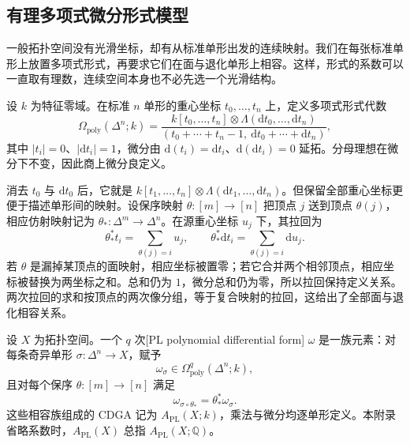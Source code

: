 \subsection{有理多项式微分形式模型}
\label{g2:subsec:E01:03}

一般拓扑空间没有光滑坐标，却有从标准单形出发的连续映射。我们在每张标准单形上放置多项式形式，再要求它们在面与退化单形上相容。这样，形式的系数可以一直取有理数，连续空间本身也不必先选一个光滑结构。

\begin{definition}\label{g2:def:polynomial-forms}
	设 \(k\) 为特征零域。在标准 \(n\) 单形的重心坐标 \(t_0,\ldots,t_n\) 上，定义多项式形式代数
	\[
		\Omega_{\mathrm{poly}}(\Delta^n;k)
		=\frac{k[t_0,\ldots,t_n]\otimes\Lambda(\mathrm dt_0,\ldots,\mathrm dt_n)}{(t_0+\cdots+t_n-1,\ \mathrm dt_0+\cdots+\mathrm dt_n)},
	\]
	其中 \(|t_i|=0\)、\(|\mathrm dt_i|=1\)，微分由 \(\mathrm d(t_i)=\mathrm dt_i\)、\(\mathrm d(\mathrm dt_i)=0\) 延拓。分母理想在微分下不变，因此商上微分良定义。
\end{definition}

消去 \(t_0\) 与 \(\mathrm dt_0\) 后，它就是 \(k[t_1,\ldots,t_n]\otimes\Lambda(\mathrm dt_1,\ldots,\mathrm dt_n)\)。但保留全部重心坐标更便于描述单形间的映射。设保序映射 \(\theta:[m]\to[n]\) 把顶点 \(j\) 送到顶点 \(\theta(j)\)，相应仿射映射记为 \(\theta_*:\Delta^m\to\Delta^n\)。在源重心坐标 \(u_j\) 下，其拉回为
\begin{equation}\label{g2:eq:polynomial-simplex-pullback}
	\theta_*^*t_i=\sum_{\theta(j)=i}u_j,\qquad
	\theta_*^*\mathrm dt_i=\sum_{\theta(j)=i}\mathrm du_j.
\end{equation}
若 \(\theta\) 是漏掉某顶点的面映射，相应坐标被置零；若它合并两个相邻顶点，相应坐标被替换为两坐标之和。总和仍为 \(1\)，微分总和仍为零，所以拉回保持定义关系。两次拉回的求和按顶点的两次像分组，等于复合映射的拉回，这给出了全部面与退化相容关系。

\begin{definition}\label{g2:def:apl-algebra}
	设 \(X\) 为拓扑空间。一个 \(q\) 次[PL polynomial differential form] \(\omega\) 是一族元素：对每条奇异单形 \(\sigma:\Delta^n\to X\)，赋予
	\[
		\omega_\sigma\in\Omega_{\mathrm{poly}}^q(\Delta^n;k),
	\]
	且对每个保序 \(\theta:[m]\to[n]\) 满足
	\[
		\omega_{\sigma\circ\theta_*}=\theta_*^*\omega_\sigma.
	\]
	这些相容族组成的 CDGA 记为 \(A_{\mathrm{PL}}(X;k)\)，乘法与微分均逐单形定义。本附录省略系数时，\(A_{\mathrm{PL}}(X)\) 总指 \(A_{\mathrm{PL}}(X;\mathbb Q)\)。
\end{definition}

